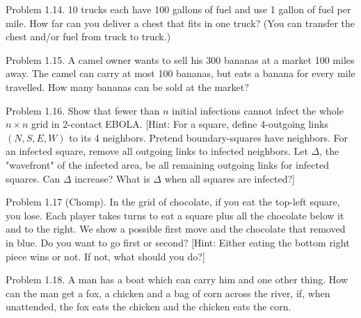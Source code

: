 \documentclass[10pt]{article}
\begin{document}
Problem 1.14. 10 trucks each have 100 gallons of fuel and use 1 gallon of fuel per mile. How far can you deliver a chest that fits in one truck? (You can transfer the chest and/or fuel from truck to truck.)

Problem 1.15. A camel owner wants to sell his 300 bananas at a market 100 miles away. The camel can carry at most 100 bananas, but eats a banana for every mile travelled. How many bananas can be sold at the market?

Problem 1.16. Show that fewer than $n$ initial infections cannot infect the whole $n \times n$ grid in 2-contact EBOLA. [Hint: For a square, define 4-outgoing links $(N, S, E, W)$ to its 4 neighbors. Pretend boundary-squares have neighbors. For an infected square, remove all outgoing links to infected neighbors. Let $\Delta$, the "wavefront" of the infected area, be all remaining outgoing links for infected squares. Can $\Delta$ increase? What is $\Delta$ when all squares are infected?]

Problem 1.17 (Chomp). In the grid of chocolate, if you eat the top-left square, you lose. Each player takes turns to eat a square plus all the chocolate below it and to the right. We show a possible first move and the chocolate that removed in blue. Do you want to go first or second? [Hint: Either eating the bottom right piece wins or not. If not, what should you do?]

Problem 1.18. A man has a boat which can carry him and one other thing. How can the man get a fox, a chicken and a bag of corn across the river, if, when unattended, the fox eats the chicken and the chicken eats the corn.
\end{document}
